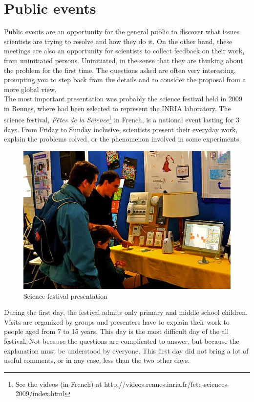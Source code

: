 \section{Public events}

Public events are an opportunity for the general public to discover what issues scientists are trying to resolve and how they do it. On the other hand, these meetings are also an opportunity for scientists to collect feedback on their work, from uninitiated persons. Uninitiated, in the sense that they are thinking about the problem for the first time. The questions asked are often very interesting, prompting you to step back from the details and to consider the proposal from a more global view.\\

The most important presentation was probably the science festival held in 2009 in Rennes, where \enti{} had been selected to represent the INRIA laboratory. The science festival, {\it Fêtes de la Science}\footnote{See the videos (in French) at http://videos.rennes.inria.fr/fete-sciences-2009/index.html} in French, is a national event lasting for 3 days. From Friday to Sunday inclusive, scientists present their everyday work, explain the problems solved, or the phenomenon involved in some experiments.

\begin{figure}
\includegraphics[width=\textwidth]{part4/pics/fdls.jpg}
\caption{Science festival presentation}
\end{figure}

During the first day, the festival admits only primary and middle school children. Visits are organized by groups and presenters have to explain their work to people aged from 7 to 15 years. This day is the most difficult day of the all festival. Not because the questions are complicated to answer, but because the explanation must be understood by everyone. This first day did not bring a lot of useful comments, or in any case, less than the two other days.\\

